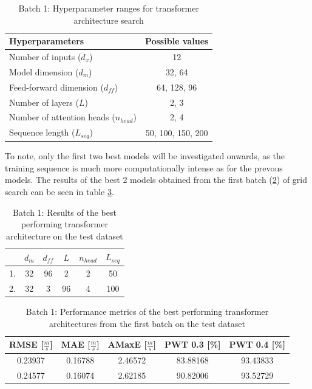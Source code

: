 \FloatBarrier
\begin{table}[h]
    \centering
    \begin{tabular}{|l|c|}
        \hline
        \textbf{Hyperparameters} & \textbf{Possible values} \\
        \hline \hline
        Number of inputs ($d_x$) & 12 \\
        \hline
        Model dimension ($d_m$) & 32, 64 \\
        \hline
        Feed-forward dimension ($d_{ff}$) & 64, 128, 96 \\
        \hline
        Number of layers ($L$) & 2, 3 \\
        \hline
        Number of attention heads ($n_{head}$) & 2, 4 \\
        \hline
        Sequence length ($L_{seq}$) & 50, 100, 150, 200 \\
        \hline
    \end{tabular}
    \caption{Batch 1: Hyperparameter ranges for transformer architecture search}
    \label{tab:transformer_hyperparams_1}
\end{table}
\FloatBarrier

To note, only the first two best models will be investigated onwards, as the training sequence is much more computationally intense as for the prevous models. The results of the best 2 models obtained from the first batch (\ref{tab:transformer_best_models_1}) of grid search can be seen in table \ref{tab:transformer_best_model_1_metrics}.

\FloatBarrier
\begin{table}[h]
    \centering
    \begin{tabular}{|c|c|c|c|c|c|}
        \hline
          & \textbf{$d_m$} & \textbf{$d_{ff}$} & \textbf{$L$} & \textbf{$n_{head}$} & \textbf{$L_{seq}$} \\
        \hline \hline
        1. & 32 & 96 & 2 & 2 & 50 \\
        \hline
        2. & 32 & 3 & 96 & 4 & 100 \\
        \hline
    \end{tabular}
    \caption{Batch 1: Results of the best performing transformer architecture on the test dataset}
    \label{tab:transformer_best_models_1}
\end{table}
\FloatBarrier

\FloatBarrier
\begin{table}[h]
    \centering
    \begin{tabular}{|c|c|c|c|c|}
        \hline
        \textbf{RMSE [$\frac{m}{s}$]} & \textbf{MAE [$\frac{m}{s}$]} & \textbf{AMaxE [$\frac{m}{s}$]} & \textbf{PWT 0.3 [\%]} & \textbf{PWT 0.4 [\%]} \\
        \hline \hline
        0.23937 & 0.16788 & 2.46572 & 83.88168 & 93.43833 \\
        \hline
        0.24577 & 0.16074 & 2.62185 & 90.82006 & 93.52729 \\
        \hline
    \end{tabular}
    \caption{Batch 1: Performance metrics of the best performing transformer architectures from the first batch on the test dataset}
    \label{tab:transformer_best_model_1_metrics}
\end{table}
\FloatBarrier

